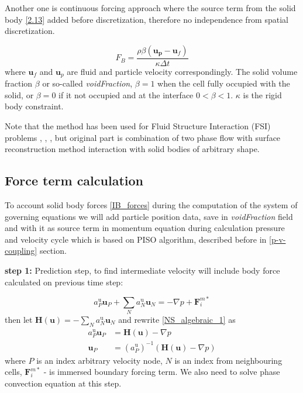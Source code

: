 Another one is continuous forcing approach \cite{mittal2005immersed} where the source term from the solid body \ref{2.13} added before discretization, therefore no independence from spatial discretization.

\begin{equation}\label{2.13}
F_{B}=\frac{\rho \beta \left(\mathbf{u}_{\mathbf{p}}-\mathbf{u}_f\right)}{\kappa \Delta t}
\end{equation}
where $\mathbf{u}_f$ and $\mathbf{u}_p$ are fluid and particle velocity correspondingly. The solid volume fraction $\beta$ or so-called \textit{voidFraction}, $\beta = 1$ when the cell fully occupied with the solid, or $\beta = 0$ if it not occupied and at the interface $0 < \beta < 1$. %
$\kappa$ is the rigid body constraint.

Note that the method has been used for Fluid Structure Interaction (FSI) problems \cite{blais2016semi}, \cite{nan2023high}, \cite{mao2020resolved}, but original part is combination of two phase flow with surface reconstruction method interaction with solid bodies of arbitrary shape. 

\subsection{Force term calculation}

To account solid body forces \ref{IB_forces} during the computation of the system of governing equations we will add particle position data, save in \textit{voidFraction} field and with it as source term in momentum equation during calculation pressure and velocity cycle which is based on PISO algorithm, described before in \ref{p-v-coupling} section.

\textbf{step 1:} Prediction step, to find intermediate velocity will include body force calculated on previous time step:

\begin{equation}\label{NS_algebraic_1}
    a_{P}^{\mathrm{u}} \mathbf{u}_{P}+\sum_{N} a_{N}^{\mathrm{u}} \mathbf{u}_{N}= -\nabla p + \mathbf{F}^{m*}_i
\end{equation}
then let $\mathbf{H}(\mathbf{u})= -\sum_{N} a_{N}^{\mathrm{u}} \mathbf{u}_{N}$ and rewrite \ref{NS_algebraic_1} as
\begin{equation}\label{NS_algebraic_2}
    \begin{aligned}
a_{P}^{\mathrm{u}} \mathbf{u}_{P} &=\mathbf{H}(\mathbf{u})-\nabla p \\
\mathbf{u}_{P} &=\left(a_{P}^{\mathrm{u}}\right)^{-1}(\mathbf{H}(\mathbf{u})-\nabla p)
\end{aligned}
\end{equation}
where $P$ is an index arbitrary velocity node, $N$ is an index from neighbouring cells, $\mathbf{F}^{m*}_i$ - is immersed boundary forcing term. We also need to solve phase convection equation at this step.

